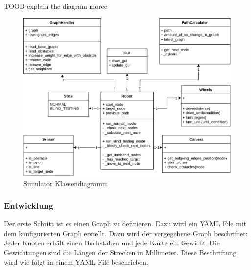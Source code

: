 TOOD explain the diagram moree

\begin{figure}[H]
\centering
\includegraphics[width=\textwidth]{assets/informatik-prototyp/simulator/simulator-erd.png}
\caption{Simulator Klassendiagramm}
\label{fig:simulator-classdia}
\end{figure}

\subsubsection{Entwicklung}

Der erste Schritt ist es einen Graph zu definieren. Dazu wird ein YAML File mit dem konfigurierten Graph erstellt. 
Dazu wird der vorgegebene Graph beschriftet: Jeder Knoten erhält einen Buchstaben und jede Kante ein Gewicht. Die Gewichtungen sind die Längen der Strecken in Millimeter. Diese Beschriftung wird wie folgt in einem YAML File beschrieben.

